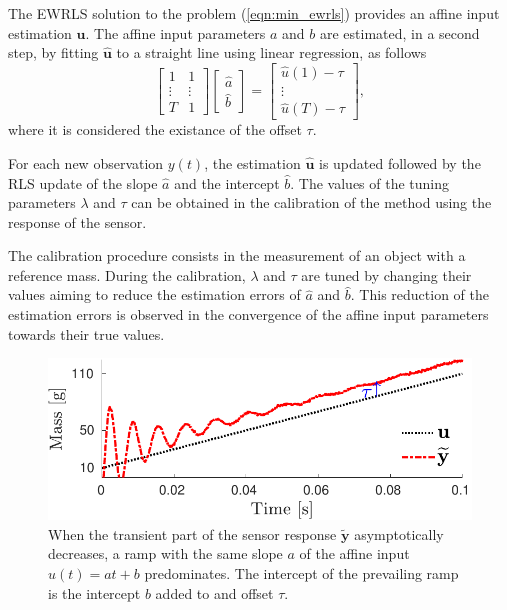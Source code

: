 The EWRLS solution to the problem (\ref{eqn:min_ewrls}) provides an affine input  estimation $\widehat{\mathbf{u}}$. 
The affine input parameters $a$ and $b$ are estimated, in a second step, by fitting $\widehat{\mathbf{u}}$ to a straight line using linear regression, as follows
\begin{equation} 
  \begin{bmatrix} 1 & 1  \\ \vdots & \vdots \\ T & 1 \end{bmatrix} 
  \begin{bmatrix} \widehat{a} \\ \widehat{b}  \end{bmatrix} = 
  \begin{bmatrix} \widehat{u}(1)-\tau \\ \vdots \\ \widehat{u}(T)-\tau \end{bmatrix}, \label{eqn:LS}
\end{equation}
where it is considered the existance of the offset $\tau$.   

For each new observation $y(t)$, the estimation $\widehat{\mathbf{u}}$ is updated followed by the RLS update of the slope $\widehat{a}$ and the intercept $\widehat{b}$.
The values of the tuning parameters $\lambda$ and $\tau$ can be obtained in the calibration of the method using the response of the sensor.

The calibration procedure consists in the measurement of an object with a reference mass.
During the calibration, $\lambda$ and $\tau$ are tuned by changing their values aiming to reduce the estimation errors of $\widehat{a}$ and $\widehat{b}$.
This reduction of the estimation errors is observed in the convergence of the affine input parameters towards their true values.

\begin{figure}[!htbp]
\centering
\includegraphics[width=1\columnwidth]{./ChapterRampInput/fig/Fig_2_1.pdf} 
\caption{ \label{fig:sensor_response} When the transient part of the sensor response $\widetilde{\mathbf{y}}$ asymptotically decreases, a ramp with the same slope $a$ of the  affine input $u(t) = at+b$ predominates. The intercept of the prevailing ramp is the intercept $b$ added to and offset $\tau$.}
\end{figure}


